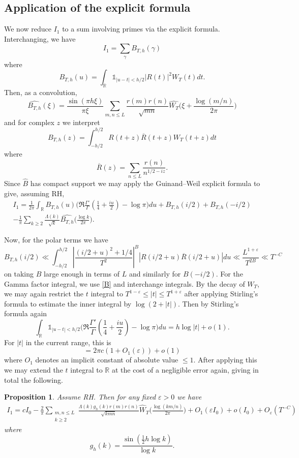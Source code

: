 \documentclass[12pt, oneside]{amsart}
\newtheorem{prop}{Proposition}
\theoremstyle{definition}
\newcommand{\mb}{\mathbb}
\newcommand{\ol}{\overline}
\newcommand{\leqs}{\leqslant }
\newcommand{\geqs}{\geqslant }
\newcommand{\wh}{\widehat}
\newcommand{\eps}{\varepsilon}
\newcommand{\1}{\mathds{1}}
\begin{document}
\subsection{Application of the explicit formula} We now reduce $I_1$ to a sum involving primes via the explicit formula. Interchanging, we have 
\[
I_1=\sum_\gamma B_{T,h}(\gamma) 
\]
where
\begin{equation}\label{B}
B_{T,h}(u)=\int_\mb{R}\mathds{1}_{|u-t|<h/2}|R(t)|^2W_T(t)dt.
\end{equation}
Then, as a convolution, 
\[
\wh{B_{T,h}}(\xi)=\frac{\sin(\pi h\xi)}{\pi\xi}\sum_{m,n\leqs L}\frac{r(m){r(n)}}{\sqrt{mn}}\wh{W_T}\Big(\xi+\frac{\log(m/n)}{2\pi}\Big)
\]
and for complex $z$ we interpret 
\[
B_{T,h}(z)=\int_{-h/2}^{h/2}R(t+z)\ol{R}(t+z) W_T(t+z)dt
\]
where 
\[
 \ol{R}(z)=\sum_{n\leqs L}\frac{{r(n)}}{n^{1/2-iz}}.
\]
Since $\wh B$ has compact support we may apply the Guinand--Weil explicit formula to give, assuming RH, 
\begin{multline*}
I_1=\frac{1}{2\pi}\int_{\mb{R}}B_{T,h}(u)\bigg(\Re\frac{\Gamma'}{\Gamma}
 \left(\frac14+\frac{i u}{2}\right)-\log\pi\bigg)du 
 +B_{T,h}(i/2)+B_{T,h}(-i/2) \\
 -\frac1\pi\sum_{k\geqs 2}
 \frac{\Lambda(k)}{\sqrt k}\wh{B_{T,h}}\Big(\frac{\log k}{2\pi}\Big).
\end{multline*}


Now, for the polar terms we have 
\[
B_{T,h}(i/2)\ll \int_{-h/2}^{h/2} \left|\frac{(i/2+u)^2+1/4}{T^2}\right|^B |R(i/2+u)\ol{R}(i/2+u)|du
\ll \frac{L^{1+\eps}}{T^{2B}}\ll T^{-C}
\]
on taking $B$ large enough in terms of $L$ and similarly for $B(-i/2)$. For the Gamma factor integral, we use \eqref{B} and interchange integrals. By the decay of $W_T$, we may again restrict the $t$ integral to $T^{1-\eps}\leqs |t|\leqs T^{1+\eps}$ after applying Stirling's formula to estimate the inner integral by $\log(2+|t|)$. Then by Stirling's formula again
\[
\int_{\mb{R}}\mathds{1}_{|u-t|<h/2}\bigg(\Re\frac{\Gamma'}{\Gamma}
 \left(\frac14+\frac{i u}{2}\right)-\log\pi\bigg)du= h\log|t|+o(1).
\]
For $|t|$ in the current range, this is 
\[
= 2\pi c(1+O_1(\eps))+o(1)
\]
where $O_1$ denotes an implicit constant of absolute value $\leqs 1$. 
After applying this we may extend the $t$ integral to $\mb{R}$ at the cost of a negligible error again, giving in total the following. 

\begin{prop}
Assume RH. Then for any fixed $\eps>0$ we have 
\begin{multline*}
I_1=cI_0-\frac{2}{\pi}\sum_{\substack{m,n\leqs L\\k\geqs 2}}\frac{\Lambda(k)g_h(k)r(m)r(n)}{\sqrt{kmn}}\wh W_T\Big(\frac{\log(km/n)}{2\pi}\Big)
+O_1(\eps I_0)+o(I_0)+O_\eps(T^{-C})
\end{multline*}
where
\[
g_h(k)=\frac{\sin( \tfrac12h\log k)}{\log k}.
\]
\end{prop}
\end{document}
